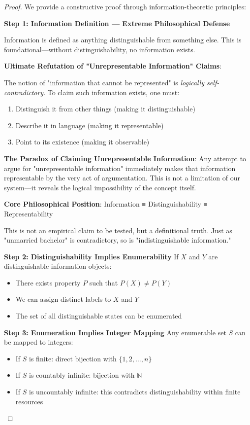 \documentclass[12pt,letterpaper]{article}
\begin{document}
\begin{proof}
We provide a constructive proof through information-theoretic principles:

\textbf{Step 1: Information Definition — Extreme Philosophical Defense}

Information is defined as anything distinguishable from something else. This is foundational—without distinguishability, no information exists.

\textbf{Ultimate Refutation of "Unrepresentable Information" Claims}:

The notion of "information that cannot be represented" is \textit{logically self-contradictory}. To claim such information exists, one must:
\begin{enumerate}
\item Distinguish it from other things (making it distinguishable)
\item Describe it in language (making it representable)  
\item Point to its existence (making it observable)
\end{enumerate}

\textbf{The Paradox of Claiming Unrepresentable Information}:
Any attempt to argue for "unrepresentable information" immediately makes that information representable by the very act of argumentation. This is not a limitation of our system—it reveals the logical impossibility of the concept itself.

\textbf{Core Philosophical Position}: Information ≡ Distinguishability ≡ Representability

This is not an empirical claim to be tested, but a definitional truth. Just as "unmarried bachelor" is contradictory, so is "indistinguishable information."

\textbf{Step 2: Distinguishability Implies Enumerability}
If $X$ and $Y$ are distinguishable information objects:
\begin{itemize}
\item There exists property $P$ such that $P(X) \neq P(Y)$
\item We can assign distinct labels to $X$ and $Y$
\item The set of all distinguishable states can be enumerated
\end{itemize}

\textbf{Step 3: Enumeration Implies Integer Mapping}
Any enumerable set $S$ can be mapped to integers:
\begin{itemize}
\item If $S$ is finite: direct bijection with $\{1, 2, \ldots, n\}$
\item If $S$ is countably infinite: bijection with $\mathbb{N}$
\item If $S$ is uncountably infinite: this contradicts distinguishability within finite resources
\end{itemize}


\end{proof}
\end{document}
